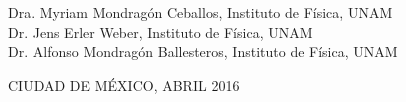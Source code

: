 \begin{titlepage}
\begin{large}
{        \indent Dra. Myriam Mondragón Ceballos,  Instituto de Física, UNAM\\   
        \indent Dr. {Jens Erler Weber},       Instituto de Física, UNAM\\  
         \indent Dr. Alfonso Mondragón Ballesteros,    Instituto de Física, UNAM\\ 
                  }                          
         \end{large}
             
        \begin{center}
        \normalsize
        CIUDAD DE MÉXICO, ABRIL 2016
        \end{center}
                 
\end{titlepage}
